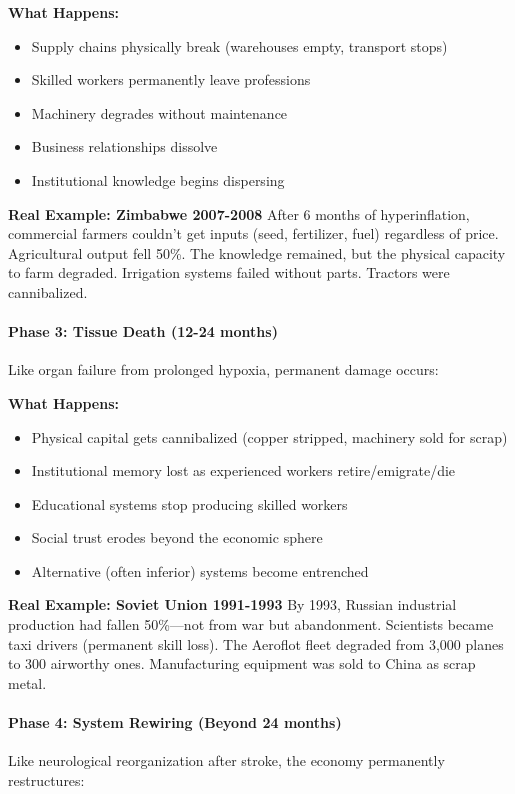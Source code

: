 \documentclass[11pt,oneside]{book}
\begin{document}
\textbf{What Happens:}
\begin{itemize}
\item Supply chains physically break (warehouses empty, transport stops)
\item Skilled workers permanently leave professions
\item Machinery degrades without maintenance
\item Business relationships dissolve
\item Institutional knowledge begins dispersing
\end{itemize}

\textbf{Real Example: Zimbabwe 2007-2008}
After 6 months of hyperinflation, commercial farmers couldn't get inputs (seed, fertilizer, fuel) regardless of price. Agricultural output fell 50\%. The knowledge remained, but the physical capacity to farm degraded. Irrigation systems failed without parts. Tractors were cannibalized.

\paragraph{Phase 3: Tissue Death (12-24 months)}
Like organ failure from prolonged hypoxia, permanent damage occurs:

\textbf{What Happens:}
\begin{itemize}
\item Physical capital gets cannibalized (copper stripped, machinery sold for scrap)
\item Institutional memory lost as experienced workers retire/emigrate/die
\item Educational systems stop producing skilled workers
\item Social trust erodes beyond the economic sphere
\item Alternative (often inferior) systems become entrenched
\end{itemize}

\textbf{Real Example: Soviet Union 1991-1993}
By 1993, Russian industrial production had fallen 50\%—not from war but abandonment. Scientists became taxi drivers (permanent skill loss). The Aeroflot fleet degraded from 3,000 planes to 300 airworthy ones. Manufacturing equipment was sold to China as scrap metal.

\paragraph{Phase 4: System Rewiring (Beyond 24 months)}
Like neurological reorganization after stroke, the economy permanently restructures:
\end{document}

